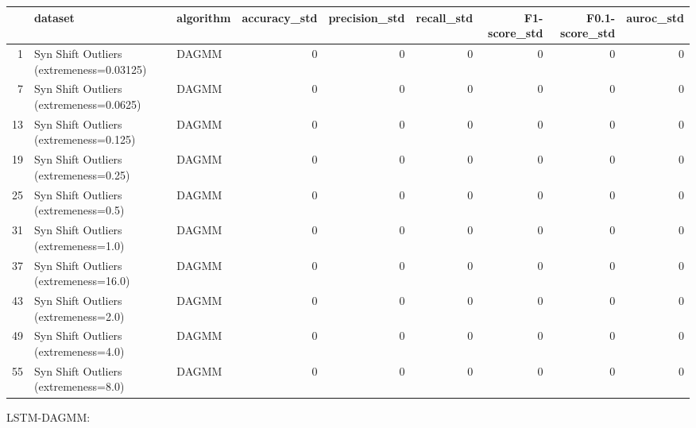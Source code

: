 \begin{tabular}{rllrrrrrr}
\hline
    & dataset                                  & algorithm   &   accuracy\_std &   precision\_std &   recall\_std &   F1-score\_std &   F0.1-score\_std &   auroc\_std \\
\hline
  1 & Syn Shift Outliers (extremeness=0.03125) & DAGMM       &              0 &               0 &            0 &              0 &                0 &           0 \\
  7 & Syn Shift Outliers (extremeness=0.0625)  & DAGMM       &              0 &               0 &            0 &              0 &                0 &           0 \\
 13 & Syn Shift Outliers (extremeness=0.125)   & DAGMM       &              0 &               0 &            0 &              0 &                0 &           0 \\
 19 & Syn Shift Outliers (extremeness=0.25)    & DAGMM       &              0 &               0 &            0 &              0 &                0 &           0 \\
 25 & Syn Shift Outliers (extremeness=0.5)     & DAGMM       &              0 &               0 &            0 &              0 &                0 &           0 \\
 31 & Syn Shift Outliers (extremeness=1.0)     & DAGMM       &              0 &               0 &            0 &              0 &                0 &           0 \\
 37 & Syn Shift Outliers (extremeness=16.0)    & DAGMM       &              0 &               0 &            0 &              0 &                0 &           0 \\
 43 & Syn Shift Outliers (extremeness=2.0)     & DAGMM       &              0 &               0 &            0 &              0 &                0 &           0 \\
 49 & Syn Shift Outliers (extremeness=4.0)     & DAGMM       &              0 &               0 &            0 &              0 &                0 &           0 \\
 55 & Syn Shift Outliers (extremeness=8.0)     & DAGMM       &              0 &               0 &            0 &              0 &                0 &           0 \\
\hline
\end{tabular}

LSTM-DAGMM:

